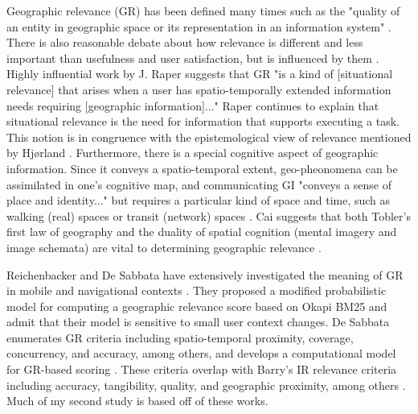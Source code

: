 Geographic relevance (GR) has been defined many times such as the "quality of an entity in geographic space or its representation in an information system" \cite{Reichenbacher2011}. There is also reasonable debate about how relevance is different and less important than usefulness and user satisfaction, but is influenced by them \cite{Mao2016}. Highly influential work by J. Raper suggests that GR "is a kind of [situational relevance] that arises when a user has spatio-temporally extended information needs requiring [geographic information]..." \cite{Raper2007} Raper continues to explain that situational relevance is the need for information that supports executing a task. This notion is in congruence with the epistemological view of relevance mentioned by Hjørland \cite{Hjorland2010}. Furthermore, there is a special cognitive aspect of geographic information. Since it conveys a spatio-temporal extent, geo-pheonomena can be assimilated in one's cognitive map, and communicating GI "conveys a sense of place and identity..." but requires a particular kind of space and time, such as walking (real) spaces or transit (network) spaces \cite{Raper2007}. Cai suggests that both Tobler's first law of geography and the duality of spatial cognition (mental imagery and image schemata) are vital to determining geographic relevance \cite{Cai2011}.


Reichenbacker and De Sabbata have extensively investigated the meaning of GR in mobile and navigational contexts \cite{Reichenbacher2016}. They proposed a modified probabilistic model for computing a geographic relevance score based on Okapi BM25 \cite{DeSabbata2010} and admit that their model is sensitive to small user context changes. De Sabbata enumerates GR criteria including spatio-temporal proximity, coverage, concurrency, and accuracy, among others, and develops a computational model for GR-based scoring \cite{DeSabbata2015} \cite{DeSabbata2014} \cite{DeSabbata2012}. These criteria overlap with Barry's IR relevance criteria including accuracy, tangibility, quality, and geographic proximity, among others \cite{Barry1998}.  Much of my second study is based off of these works.

